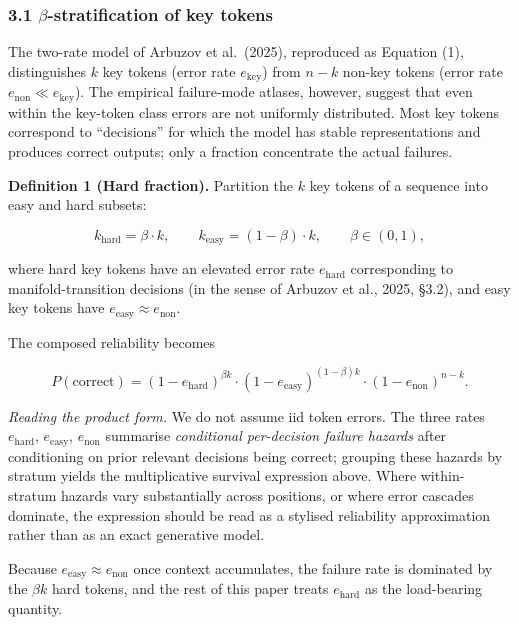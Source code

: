 \documentclass[
]{article}
\begin{document}
\subsubsection{\texorpdfstring{3.1 \(\beta\)-stratification of key
tokens}{3.1 \textbackslash beta-stratification of key tokens}}\label{beta-stratification-of-key-tokens}

The two-rate model of Arbuzov et al.~(2025), reproduced as Equation (1),
distinguishes \(k\) key tokens (error rate \(e_{\text{key}}\)) from
\(n - k\) non-key tokens (error rate
\(e_{\text{non}} \ll e_{\text{key}}\)). The empirical failure-mode
atlases, however, suggest that even within the key-token class errors
are not uniformly distributed. Most key tokens correspond to
``decisions'' for which the model has stable representations and
produces correct outputs; only a fraction concentrate the actual
failures.

\textbf{Definition 1 (Hard fraction).} Partition the \(k\) key tokens of
a sequence into easy and hard subsets:

\[
k_{\text{hard}} = \beta \cdot k, \qquad k_{\text{easy}} = (1 - \beta) \cdot k, \qquad \beta \in (0,1),
\]

where hard key tokens have an elevated error rate \(e_{\text{hard}}\)
corresponding to manifold-transition decisions (in the sense of Arbuzov
et al., 2025, §3.2), and easy key tokens have
\(e_{\text{easy}} \approx e_{\text{non}}\).

The composed reliability becomes

\[
P(\text{correct}) = (1 - e_{\text{hard}})^{\beta k} \cdot (1 - e_{\text{easy}})^{(1 - \beta) k} \cdot (1 - e_{\text{non}})^{n - k}.
\]

\emph{Reading the product form.} We do not assume iid token errors. The
three rates \(e_{\text{hard}}\), \(e_{\text{easy}}\), \(e_{\text{non}}\)
summarise \emph{conditional per-decision failure hazards} after
conditioning on prior relevant decisions being correct; grouping these
hazards by stratum yields the multiplicative survival expression above.
Where within-stratum hazards vary substantially across positions, or
where error cascades dominate, the expression should be read as a
stylised reliability approximation rather than as an exact generative
model.

Because \(e_{\text{easy}} \approx e_{\text{non}}\) once context
accumulates, the failure rate is dominated by the \(\beta k\) hard
tokens, and the rest of this paper treats \(e_{\text{hard}}\) as the
load-bearing quantity.
\end{document}

